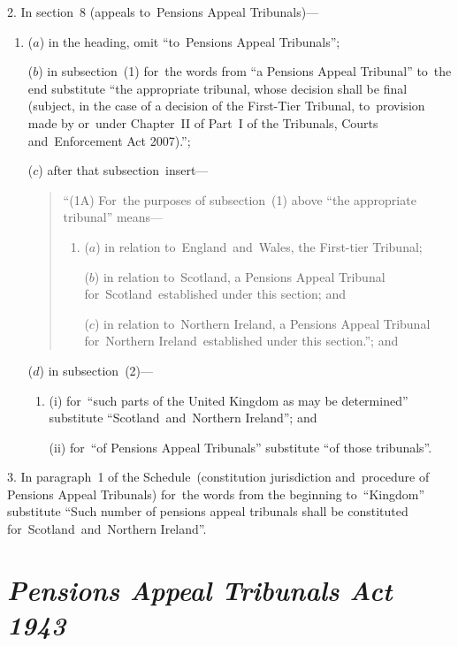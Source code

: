 \documentclass[12pt,a4paper]{article}
\begin{document}
2.  In section~8 (appeals to~Pensions Appeal Tribunals)—
\begin{enumerate}\item[]
($a$) in the heading, omit “to~Pensions Appeal Tribunals”;

($b$) in subsection~(1) for~the words from “a Pensions Appeal Tribunal” to~the end substitute “the appropriate tribunal, whose decision shall be final (subject, in the case of a decision of the First-Tier Tribunal, to~provision made by or~under Chapter~II of Part~I of the Tribunals, Courts and~Enforcement Act 2007).”;

($c$) after that subsection~insert—
\begin{quotation}
“(1A) For~the purposes of subsection~(1) above “the appropriate tribunal” means—
\begin{enumerate}\item[]
($a$) in relation to~England~and~Wales, the First-tier Tribunal;

($b$) in relation to~Scotland, a Pensions Appeal Tribunal for~Scotland~established under this section; and

($c$) in relation to~Northern Ireland, a Pensions Appeal Tribunal for~Northern Ireland~established under this section.”; and
\end{enumerate}
\end{quotation}

($d$) in subsection~(2)—
\begin{enumerate}\item[]
(i) for~“such parts of the United Kingdom as may be determined” substitute “Scotland~and~Northern Ireland”; and

(ii) for~“of Pensions Appeal Tribunals” substitute “of those tribunals”.
\end{enumerate}
\end{enumerate}

\medskip

3.  In paragraph~1 of the Schedule~(constitution jurisdiction and~procedure of Pensions Appeal Tribunals) for~the words from the beginning to~“Kingdom” substitute “Such number of pensions appeal tribunals shall be constituted for~Scotland~and~Northern Ireland”.

\section*{\itshape Pensions Appeal Tribunals Act 1943}
\end{document}
